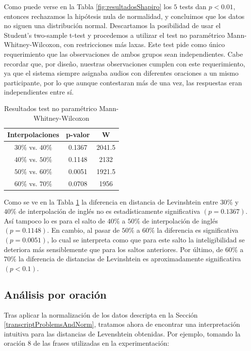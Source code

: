 Como puede verse en la Tabla \ref{fig:resultadosShapiro} los $5$ tests dan $p<0.01$, entonces rechazamos la hipótesis nula de normalidad, y concluimos que los datos no siguen una distribución normal. Descartamos la posibilidad de usar el Student's two-sample t-test y procedemos a utilizar el test no paramétrico Mann-Whitney-Wilcoxon, con restricciones más laxas. Este test pide como único requerimiento que las observaciones de ambos grupos sean independientes. Cabe recordar que, por diseño, nuestras observaciones cumplen con este requerimiento, ya que el sistema siempre asignaba audios con diferentes oraciones a un mismo participante, por lo que aunque contestaran más de una vez, las respuestas eran independientes entre sí.

\begin{table}
\centering
\begin{tabular}[t]{| c | c | c |}
\hline
Interpolaciones & p-valor & W \\
\hline
\hline
$30\%$ vs. $40\%$ & 0.1367 & 2041.5 \\
\hline
$40\%$ vs. $50\%$ & 0.1148 & 2132 \\
\hline
$50\%$ vs. $60\%$ & 0.0051 & 1921.5 \\
\hline
$60\%$ vs. $70\%$ & 0.0708 & 1956 \\
\hline
\end{tabular}
\caption{Resultados test no paramétrico Mann-Whitney-Wilcoxon} 
\label{tabla:Whitney}
\end{table}

Como se ve en la Tabla \ref{tabla:Whitney} la diferencia en distancia de Levinshtein entre $30\%$ y $40\%$ de interpolación de inglés no es estadísticamente significativa $(p=0.1367)$. Así tampoco lo es para el salto de $40\%$ a $50\%$ de interpolación de inglés $(p=0.1148)$. En cambio, al pasar de $50\%$ a $60\%$ la diferencia es significativa $(p=0.0051)$, lo cual se interpreta como que para este salto la inteligibilidad se deteriora más sensiblemente que para los saltos anteriores. Por último, de $60\%$ a $70\%$ la diferencia de distancias de Levinshtein es aproximadamente significativa $(p<0.1)$.

\subsection{Análisis por oración}\label{analisisPorOracion}
Tras aplicar la normalización de los datos descripta en la Sección \ref{transcriptProblemsAndNorm}, tratamos ahora de encontrar una interpretación intuitiva para las distancias de Levenshtein obtenidas. Por ejemplo, tomando la oración $8$ de las frases utilizadas en la experimentación:

